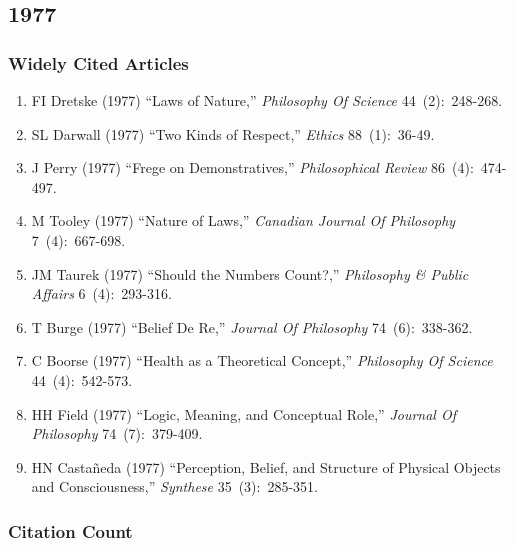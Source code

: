 \documentclass[
  10pt,
  letterpaper,
  DIV=11,
  numbers=noendperiod,
  twoside]{scrartcl}
\providecommand{\tightlist}{%
  \setlength{\itemsep}{0pt}\setlength{\parskip}{0pt}}\usepackage{longtable,booktabs,array}
\begin{document}
\newpage

\subsection{1977}\label{sec-s1977}

\subsubsection*{Widely Cited Articles}\label{widely-cited-articles-21}

\begin{enumerate}
\def\labelenumi{\arabic{enumi}.}
\tightlist
\item
  FI Dretske (1977) ``Laws of Nature,'' \emph{Philosophy Of Science}
  44~(2):~248-268.
\item
  SL Darwall (1977) ``Two Kinds of Respect,'' \emph{Ethics}
  88~(1):~36-49.
\item
  J Perry (1977) ``Frege on Demonstratives,'' \emph{Philosophical
  Review} 86~(4):~474-497.
\item
  M Tooley (1977) ``Nature of Laws,'' \emph{Canadian Journal Of
  Philosophy} 7~(4):~667-698.
\item
  JM Taurek (1977) ``Should the Numbers Count?,'' \emph{Philosophy \&
  Public Affairs} 6~(4):~293-316.
\item
  T Burge (1977) ``Belief De Re,'' \emph{Journal Of Philosophy}
  74~(6):~338-362.
\item
  C Boorse (1977) ``Health as a Theoretical Concept,'' \emph{Philosophy
  Of Science} 44~(4):~542-573.
\item
  HH Field (1977) ``Logic, Meaning, and Conceptual Role,'' \emph{Journal
  Of Philosophy} 74~(7):~379-409.
\item
  HN Castañeda (1977) ``Perception, Belief, and Structure of Physical
  Objects and Consciousness,'' \emph{Synthese} 35~(3):~285-351.
\end{enumerate}

\subsubsection*{Citation Count}\label{sec-count-1977}
\end{document}
